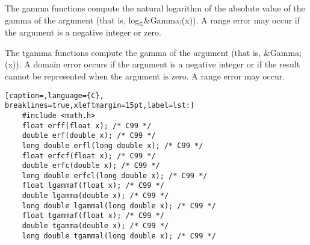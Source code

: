 The gamma functions compute the natural logarithm of the absolute value of the
gamma of the argument (that is,
log\(_{\emph{e}}\)\textbar{}\&Gamma;(x)\textbar{}). A range error may occur if
the argument is a negative integer or zero.

The tgamma functions compute the gamma of the argument (that is, \&Gamma;(x)).
A domain error occurs if the argument is a negative integer or if the result
cannot be represented when the argument is zero. A range error may occur.

\lstset{basicstyle=\scriptsize, numbers=left, captionpos=b, tabsize=4}
\begin{lstlisting}[caption=,language={C},
breaklines=true,xleftmargin=15pt,label=lst:]
	#include <math.h>
	float erff(float x); /* C99 */
	double erf(double x); /* C99 */
	long double erfl(long double x); /* C99 */
	float erfcf(float x); /* C99 */
	double erfc(double x); /* C99 */
	long double erfcl(long double x); /* C99 */
	float lgammaf(float x); /* C99 */
	double lgamma(double x); /* C99 */
	long double lgammal(long double x); /* C99 */
	float tgammaf(float x); /* C99 */
	double tgamma(double x); /* C99 */
	long double tgammal(long double x); /* C99 */
\end{lstlisting}
